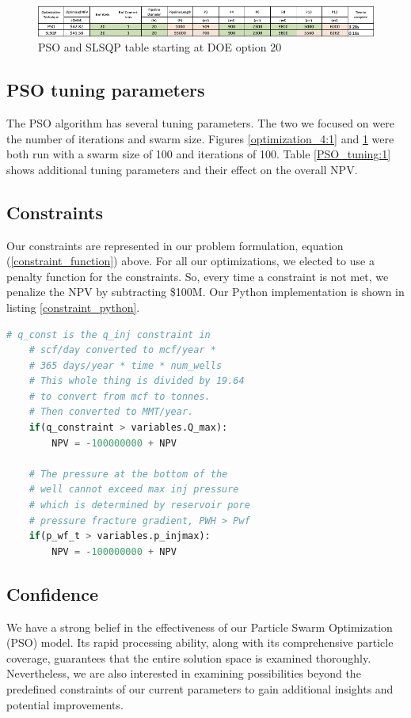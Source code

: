 \documentclass[balance,upint,subscriptcorrection,varvw,mathalfa=cal=boondoxo,spanish,french,vietnamese,russian,greek,pdf-a,colorlinks]{asmeconf}
\begin{document}

\begin{figure}[btp]
\centering\includegraphics[width=0.7\linewidth]{images/optimization_point_20.jpg}
\caption{PSO and SLSQP table starting at DOE option 20}\label{optimization_20:1}
\end{figure}


\subsection*{PSO tuning parameters}
The PSO algorithm has several tuning parameters. The two we focused on were the number of iterations and swarm size. Figures \ref{optimization_4:1} and \ref{optimization_20:1} were both run with a swarm size of 100 and iterations of 100. Table \ref{PSO_tuning:1} shows additional tuning parameters and their effect on the overall NPV. 

\subsection*{Constraints}
Our constraints are represented in our problem formulation, equation (\ref{constraint_function}) above. For all our optimizations, we elected to use a penalty function for the constraints. So, every time a constraint is not met, we penalize the NPV by subtracting \$100M. Our Python implementation is shown in listing \ref{constraint_python}.

\begin{lstlisting}[language=Python, caption=Constraint's in Python, label=constraint_python]
    # q_const is the q_inj constraint in 
    # scf/day converted to mcf/year * 
    # 365 days/year * time * num_wells
    # This whole thing is divided by 19.64 
    # to convert from mcf to tonnes. 
    # Then converted to MMT/year.
    if(q_constraint > variables.Q_max):
        NPV = -100000000 + NPV

    # The pressure at the bottom of the 
    # well cannot exceed max inj pressure 
    # which is determined by reservoir pore 
    # pressure fracture gradient, PWH > Pwf
    if(p_wf_t > variables.p_injmax):
        NPV = -100000000 + NPV
\end{lstlisting}

\subsection*{Confidence}
We have a strong belief in the effectiveness of our Particle Swarm Optimization (PSO) model. Its rapid processing ability, along with its comprehensive particle coverage, guarantees that the entire solution space is examined thoroughly. Nevertheless, we are also interested in examining possibilities beyond the predefined constraints of our current parameters to gain additional insights and potential improvements.
\end{document}
